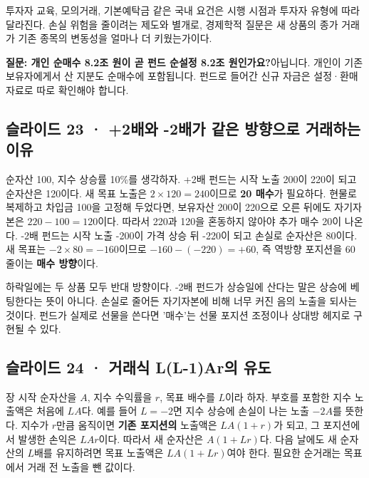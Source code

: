 \documentclass[11pt,a4paper]{article}
\begin{document}
투자자 교육, 모의거래, 기본예탁금 같은 국내 요건은 시행 시점과 투자자 유형에 따라 달라진다. 손실 위험을 줄이려는 제도와 별개로, 경제학적 질문은 새 상품의 종가 거래가 기존 종목의 변동성을 얼마나 더 키웠는가이다.\par

\begin{samepage}\par\medskip\noindent\textbf{질문: 개인 순매수 8.2조 원이 곧 펀드 순설정 8.2조 원인가요?}\quad 아닙니다. 개인이 기존 보유자에게서 산 지분도 순매수에 포함됩니다. 펀드로 들어간 신규 자금은 설정·환매 자료로 따로 확인해야 합니다.\par\end{samepage}

\subsection{슬라이드 23 · +2배와 -2배가 같은 방향으로 거래하는 이유}
순자산 100, 지수 상승률 10\%를 생각하자. +2배 펀드는 시작 노출 200이 220이 되고 순자산은 120이다. 새 목표 노출은 $2\times120=240$이므로 \textbf{20 매수}가 필요하다. 현물로 복제하고 차입금 100을 고정해 두었다면, 보유자산 200이 220으로 오른 뒤에도 자기자본은 $220-100=120$이다. 따라서 220과 120을 혼동하지 않아야 추가 매수 20이 나온다. -2배 펀드는 시작 노출 -200이 가격 상승 뒤 -220이 되고 손실로 순자산은 80이다. 새 목표는 $-2\times80=-160$이므로 $-160-(-220)=+60$, 즉 역방향 포지션을 60 줄이는 \textbf{매수 방향}이다.\par

하락일에는 두 상품 모두 반대 방향이다. -2배 펀드가 상승일에 산다는 말은 상승에 베팅한다는 뜻이 아니다. 손실로 줄어든 자기자본에 비해 너무 커진 음의 노출을 되사는 것이다. 펀드가 실제로 선물을 쓴다면 '매수'는 선물 포지션 조정이나 상대방 헤지로 구현될 수 있다.\par

\subsection{슬라이드 24 · 거래식 L(L-1)Ar의 유도}
장 시작 순자산을 $A$, 지수 수익률을 $r$, 목표 배수를 $L$이라 하자. 부호를 포함한 지수 노출액은 처음에 $LA$다. 예를 들어 $L=-2$면 지수 상승에 손실이 나는 노출 $-2A$를 뜻한다. 지수가 $r$만큼 움직이면 \textbf{기존 포지션의} 노출액은 $LA(1+r)$가 되고, 그 포지션에서 발생한 손익은 $LAr$이다. 따라서 새 순자산은 $A(1+Lr)$다. 다음 날에도 새 순자산의 $L$배를 유지하려면 목표 노출액은 $LA(1+Lr)$여야 한다. 필요한 순거래는 목표에서 거래 전 노출을 뺀 값이다.\par
\end{document}
